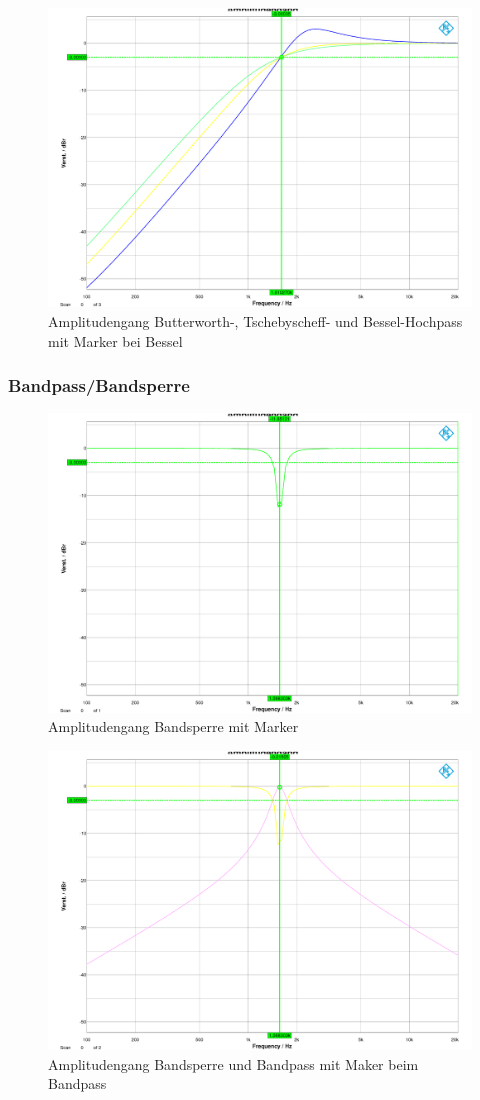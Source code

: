 \begin{figure}[h]
\centering
\includegraphics[width=0.60\linewidth]{Bilder/ImLabor/Amplitudengang_1_3_Bessel_HP_Alle}
\caption{Amplitudengang Butterworth-, Tschebyscheff- und Bessel-Hochpass mit Marker bei Bessel}
\label{fig:Amplitudengang_1_3_Bessel_HP_Alle}
\end{figure}

\clearpage

\subsubsection{Bandpass/Bandsperre}
\begin{figure}[h]
\centering
\includegraphics[width=0.60\linewidth]{Bilder/ImLabor/Amplitudengang_3_2_BS}
\caption{Amplitudengang Bandsperre mit Marker}
\label{fig:Amplitudengang_3_2_BS}
\end{figure}

\begin{figure}[h]
\centering
\includegraphics[width=0.60\linewidth]{Bilder/ImLabor/Amplitudengang_3_3_BP_BS}
\caption{Amplitudengang Bandsperre und Bandpass mit Maker beim Bandpass}
\label{fig:Amplitudengang_3_3_BP_BS}
\end{figure}

